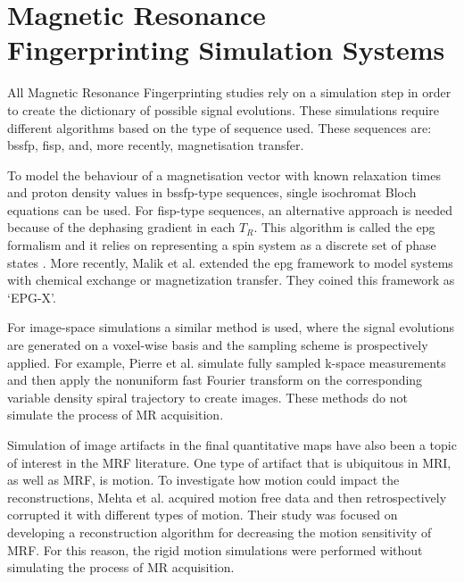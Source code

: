 \section{Magnetic Resonance Fingerprinting Simulation Systems}
\label{chapterlabel2sec2}

All Magnetic Resonance Fingerprinting studies rely on a simulation step in order to create the dictionary of possible signal evolutions.
These simulations require different algorithms based on the type of sequence used.
These sequences are: \ac{bssfp}, \ac{fisp}, and, more recently, magnetisation transfer.

\hfill

To model the behaviour of a magnetisation vector with known relaxation times and proton density values in \ac{bssfp}-type sequences, single isochromat Bloch equations can be used. 
For \ac{fisp}-type sequences, an alternative approach is needed because of the dephasing gradient in each $T_R$.
This algorithm is called the \ac{epg} formalism and it relies on representing a spin system as a discrete set of phase states \cite{Weigel2015}.
More recently, Malik et al. \cite{Malik2017} extended the \ac{epg} framework to model systems with chemical exchange or magnetization transfer. They coined this framework as `EPG-X'.

\hfill

For image-space simulations a similar method is used, where the signal evolutions are generated on a voxel-wise basis and the sampling scheme is prospectively applied.
For example, Pierre et al. \cite{Pierre2016} simulate fully sampled k-space measurements and then apply the nonuniform fast Fourier transform on the corresponding variable density spiral trajectory to create images. 
These methods do not simulate the process of MR acquisition.

\hfill

Simulation of image artifacts in the final quantitative maps have also been a topic of interest in the MRF literature.
One type of artifact that is ubiquitous in MRI, as well as MRF, is motion.
To investigate how motion could impact the reconstructions, Mehta et al. \cite{Mehta2017} acquired motion free data and then retrospectively corrupted it with different types of motion.
Their study was focused on developing a reconstruction algorithm for decreasing the motion sensitivity of MRF.
For this reason, the rigid motion simulations were performed without simulating the process of MR acquisition.

